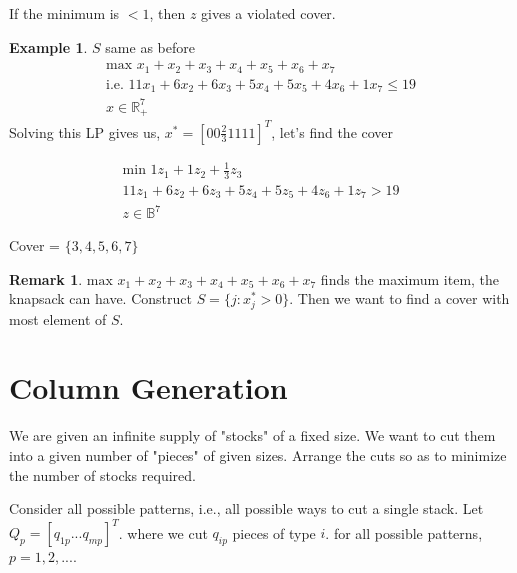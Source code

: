 \documentclass{article}
\theoremstyle{plain}
\theoremstyle{definition}
\newtheorem{eg}{Example}
\newtheorem{rmk}{Remark}
\begin{document}
If the minimum is $<1$, then $z$ gives a violated cover.

\begin{eg}
    $S$ same as before
    \begin{gather*}
        \text{max } x_1 + x_2 + x_3 + x_4 + x_5 + x_6 + x_7\\
        \text{i.e. } 11x_1 + 6x_2 + 6x_3 + 5x_4 + 5x_5 + 4x_6 + 1x_7 \leq 19\\
        x\in\mathbb{R}_+^7
    \end{gather*}
    Solving this LP gives us, $x^* = [0 0 \frac{2}{3} 1  1 1 1]^T$, let's find the cover

    \begin{gather*}
        \text{min } 1z_1  + 1z_2 + \frac{1}{3}z_3\\
        11z_1 + 6z_2 + 6z_3 + 5z_4 + 5z_5 + 4z_6 + 1z_7 > 19\\
        z\in\mathbb{B}^7
    \end{gather*}

\begin{comment}
    To solve this LP, we can convert it to knapsack problem.
    \begin{gather*}
        y_j = 1 - z_j\\
        \text{max } \frac{2}{3}y_3 + y_4 + y_5 + y_6 + y_7\\
        \text{s.t. } 11y_1 + 6y_2 + 6y_3 + 5y_4 + 5y_5 + 4y_6 + 1y_7 \leq 19
    \end{gather*}
    Solve with DP, it yields $y* =[ 1 1 0 0 0 0 0]^T$, $z* = [0 0 1 1 1 1 1]$,
\end{comment}
    Cover = $\{3, 4, 5, 6, 7\}$
\end{eg}

\begin{rmk}
    $\text{max } x_1 + x_2 + x_3 + x_4 + x_5 + x_6 + x_7$ finds the maximum item,
    the knapsack can have. Construct $S = \{j: x^*_j > 0\}$.
    Then we want to find a cover with most element of $S$.
\end{rmk}

\section{Column Generation}
We are given an infinite supply of "stocks" of a fixed size. We want to cut them into
a given number of "pieces" of given sizes. Arrange the cuts so as to minimize the number
of stocks required.

Consider all possible patterns, i.e., all possible ways to cut a single stack. Let
$Q_p = [q_{1p} ... q_{mp}]^T$. where we cut $q_{ip}$ pieces of type $i$. for all
possible patterns, $p=1,2,...$.
\end{document}
